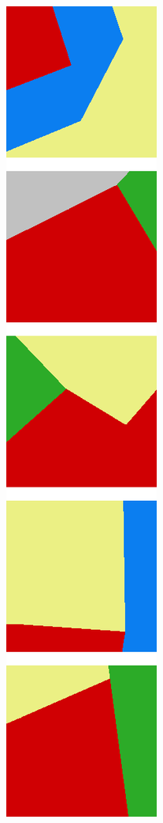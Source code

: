 \begin{figure}[h]
\begin{subfigure}{\DensenetPredictionsImageWidth}
        \caption{}
        \label{fig:densenet_pred_original}
    \end{subfigure} \hspace{1mm}
    \begin{subfigure}{\DensenetPredictionsImageWidth}
        \includegraphics[width=\textwidth]{images/densenet/labels}

\end{subfigure}
\end{figure}
